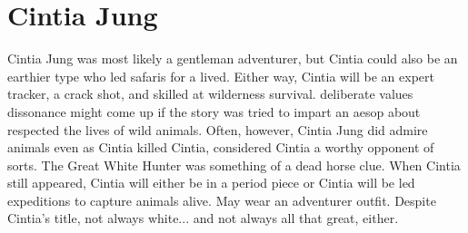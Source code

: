 \documentclass[12pt]{book}
\begin{document}
\chapter{Cintia Jung}

Cintia Jung was most likely a gentleman adventurer, but Cintia could also be an earthier type who led safaris for a lived. Either way, Cintia will be an expert tracker, a crack shot, and skilled at wilderness survival. deliberate values dissonance might come up if the story was tried to impart an aesop about respected the lives of wild animals. Often, however, Cintia Jung did admire animals even as Cintia killed Cintia, considered Cintia a worthy opponent of sorts. The Great White Hunter was something of a dead horse clue. When Cintia still appeared, Cintia will either be in a period piece or Cintia will be led expeditions to capture animals alive. May wear an adventurer outfit. Despite Cintia's title, not always white... and not always all that great, either.
\end{document}
